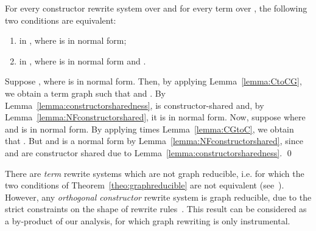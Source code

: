 \documentclass{LMCS}
\begin{document}
\begin{thm}\label{theo:graphreducible}
For every constructor rewrite system  over  and
for every term  over , the following two conditions are
equivalent:
\begin{enumerate}[\em 1.]
\item
   in , where  is in normal form;
\item
   in , where  is in normal
  form and .
\end{enumerate}
\end{thm}
\proof
Suppose , where  is in normal form. 
Then, by applying Lemma~\ref{lemma:CtoCG}, we obtain a term graph  such that
 and .
By Lemma~\ref{lemma:constructorsharedness},  is constructor-shared and, by 
Lemma~\ref{lemma:NFconstructorshared}, 
it is in normal form. Now, suppose  where
 and  is in normal form. By
applying  times Lemma~\ref{lemma:CGtoC}, we obtain
that .
But  and  is a normal form 
by Lemma~\ref{lemma:NFconstructorshared}, since 
 and  are
constructor shared due to Lemma~\ref{lemma:constructorsharedness}.
\qed

There are \emph{term} rewrite systems which are not graph reducible, i.e.
for which the two conditions of Theorem~\ref{theo:graphreducible} are
not equivalent (see~\cite{TGRbarendregt}). However, any 
\emph{orthogonal constructor} rewrite system is graph reducible, due to the 
strict constraints on the shape of rewrite rules~\cite{Plump90ggacs}.
This result can be considered as a by-product of our analysis, for which graph rewriting
is only instrumental.
\end{document}
